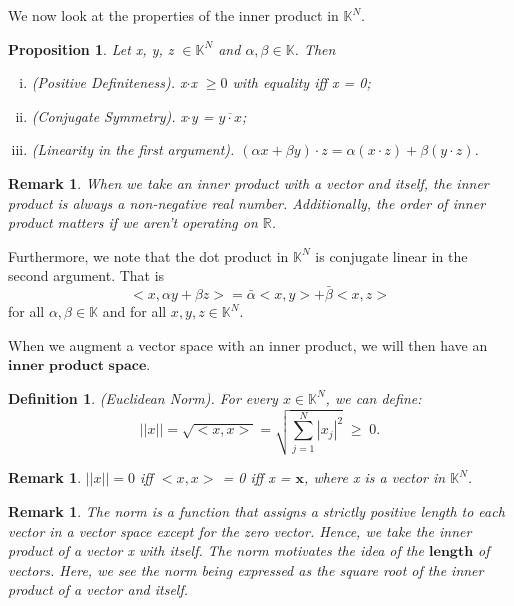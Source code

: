 \documentclass[twoside]{article}
\newtheorem{proposition}[theorem]{Proposition}
\newtheorem{remark}[theorem]{Remark}
\newtheorem{definition}[theorem]{Definition}
\begin{document}
We now look at the properties of the inner product in $\mathbb{K}^N$.

\begin{proposition}
Let x, y, z $\in \mathbb{K}^N$ and $\alpha, \beta \in \mathbb{K}$. Then
\begin{enumerate}[(i)]
  \item (Positive Definiteness). x$\cdot$x $\geq 0 $ with equality iff x = 0;
  \item (Conjugate Symmetry). x$\cdot$y = $\overline{y \cdot x}$;
  \item (Linearity in the first argument). $(\alpha x + \beta y) \cdot z = \alpha(x \cdot z) + \beta(y \cdot z)$.
\end{enumerate}
\end{proposition}

\begin{remark}
When we take an inner product with a vector and itself, the inner product is always a non-negative real number. Additionally, the order of inner product matters if we aren't operating on $\mathbb{R}$.
\end{remark}

Furthermore, we note that the dot product in $\mathbb{K}^N$ is conjugate linear in the second argument. That is
$$
<x, \alpha y + \beta z> = \bar{\alpha}<x,y> + \bar{\beta}<x,z>
$$
for all $\alpha, \beta \in \mathbb{K}$ and for all $x,y,z \in \mathbb{K}^N$.

When we augment a vector space with an inner product, we will then have an $\textbf{inner product space}$.

\begin{definition}
(Euclidean Norm). For every $x \in \mathbb{K}^N$, we can define:
$$
||x|| = \sqrt{<x,x>} = \sqrt{\sum_{j=1}^{N}|x_j|^2} \; \geq \; 0.
$$
\end{definition}

\begin{remark}
$||x|| = 0$ iff $<x,x>$ = 0 iff x = $\mathbf{x}$, where x is a vector in $\mathbb{K}^N$.
\end{remark}

\begin{remark}
The norm is a function that assigns a strictly positive length to each vector in a vector space except for the zero vector. Hence, we take the inner product of a vector x with itself. The norm motivates the idea of the $\textbf{length}$ of vectors. Here, we see the norm being expressed as the square root of the inner product of a vector and itself. 
\end{remark}
\end{document}
